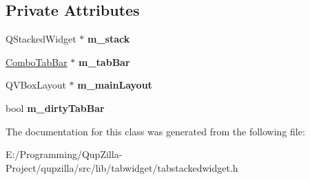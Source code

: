 \subsection*{Private Attributes}
\begin{DoxyCompactItemize}
\item 
\hypertarget{class_tab_stacked_widget_a4f7c1e2a129fe25475330ce31a543e20}{
QStackedWidget $\ast$ {\bfseries m\_\-stack}}
\label{class_tab_stacked_widget_a4f7c1e2a129fe25475330ce31a543e20}

\item 
\hypertarget{class_tab_stacked_widget_a70ba27bb0c4b3499eb6484f4e1532fde}{
\hyperlink{class_combo_tab_bar}{ComboTabBar} $\ast$ {\bfseries m\_\-tabBar}}
\label{class_tab_stacked_widget_a70ba27bb0c4b3499eb6484f4e1532fde}

\item 
\hypertarget{class_tab_stacked_widget_a11003c41b44f06a5248939be3a2ed5f1}{
QVBoxLayout $\ast$ {\bfseries m\_\-mainLayout}}
\label{class_tab_stacked_widget_a11003c41b44f06a5248939be3a2ed5f1}

\item 
\hypertarget{class_tab_stacked_widget_a502d1a8effcefef8a899ed85f945e60b}{
bool {\bfseries m\_\-dirtyTabBar}}
\label{class_tab_stacked_widget_a502d1a8effcefef8a899ed85f945e60b}

\end{DoxyCompactItemize}


The documentation for this class was generated from the following file:\begin{DoxyCompactItemize}
\item 
E:/Programming/QupZilla-\/Project/qupzilla/src/lib/tabwidget/tabstackedwidget.h\end{DoxyCompactItemize}
